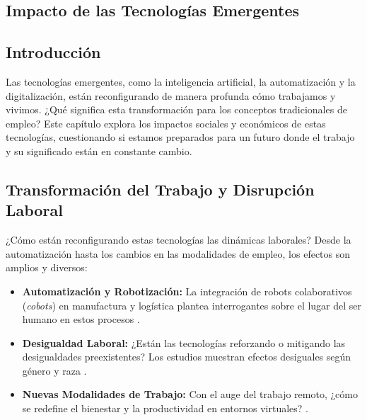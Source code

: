 \begin{refsection}
\chapter{Impacto de las Tecnologías Emergentes}
\label{chapter:chapter-2}

\section{Introducción}
Las tecnologías emergentes, como la inteligencia artificial, la automatización y la digitalización, están reconfigurando de manera profunda cómo trabajamos y vivimos. ¿Qué significa esta transformación para los conceptos tradicionales de empleo? Este capítulo explora los impactos sociales y económicos de estas tecnologías, cuestionando si estamos preparados para un futuro donde el trabajo y su significado están en constante cambio.

\section{Transformación del Trabajo y Disrupción Laboral}
¿Cómo están reconfigurando estas tecnologías las dinámicas laborales? Desde la automatización hasta los cambios en las modalidades de empleo, los efectos son amplios y diversos:
\begin{itemize}
    \item \textbf{Automatización y Robotización:} La integración de robots colaborativos (\textit{cobots}) en manufactura y logística plantea interrogantes sobre el lugar del ser humano en estos procesos \cite{WOS:000668201400001}.
    \item \textbf{Desigualdad Laboral:} ¿Están las tecnologías reforzando o mitigando las desigualdades preexistentes? Los estudios muestran efectos desiguales según género y raza \cite{WOS:001108050800001}.
    \item \textbf{Nuevas Modalidades de Trabajo:} Con el auge del trabajo remoto, ¿cómo se redefine el bienestar y la productividad en entornos virtuales? \cite{WOS:001195543500001}.
\end{itemize}


\end{refsection}
